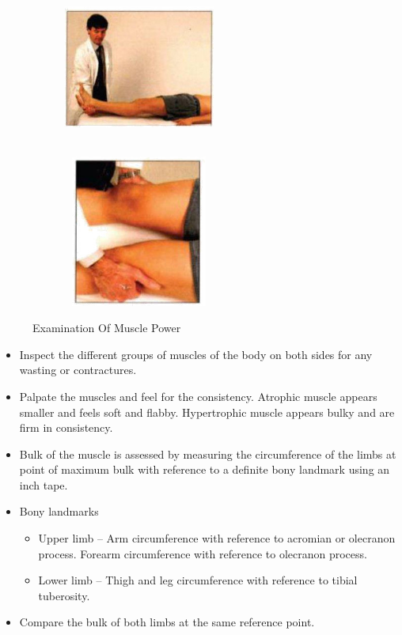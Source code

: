 \documentclass[a4paper,12pt,openany,oneside]{book}
\begin{document}
{\begin{figure}[H]
\begin{subfigure}[t]{.25\textwidth}
		\end{subfigure}
		\hspace{\fill}
		\begin{subfigure}[t]{.25\textwidth}
			\includegraphics[width=5cm,height=5cm]{./clinicalPhysioPic/motorSystem/hipExtension.jpg}
		\end{subfigure}
		\hspace{\fill}
		\begin{subfigure}[t]{.25\textwidth}
			\includegraphics[width=5cm,height=5cm]{./clinicalPhysioPic/motorSystem/hipAbduction.jpg}
		\end{subfigure}
		\caption*{Examination Of Muscle Power}
	\end{figure}
}
\begin{itemize}
\item{Inspect the different groups of muscles of the body on both sides for any wasting or contractures.}
\item{Palpate the muscles and feel for the consistency. Atrophic muscle appears smaller and feels soft and flabby. Hypertrophic muscle appears bulky and are firm in consistency.}
\item{Bulk of the muscle is assessed by measuring the circumference of the limbs at point of maximum bulk with reference to a definite bony landmark using an inch tape.}
\item{Bony landmarks}
	\begin{itemize}
		\item[]Upper limb 	–	Arm circumference with reference to acromian or olecranon 			process. Forearm circumference with reference to olecranon 			process.
		\item[]Lower limb 	–	Thigh and leg circumference with reference to tibial 				tuberosity. 
	\end{itemize}
\item{ Compare the bulk of both limbs at the same reference point.}
\end{itemize}
\end{document}
